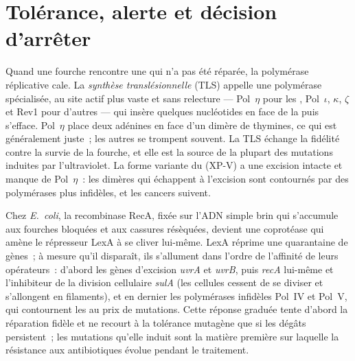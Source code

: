 \section{Tolérance, alerte et décision d'arrêter}

\begin{definition}\label{def:b3:dna-repair:tls}
Quand une fourche rencontre une  qui n'a pas été réparée, la
polymérase réplicative cale. La \emph{synthèse translésionnelle} (TLS)
appelle une polymérase spécialisée, au site actif plus vaste et sans
relecture --- Pol~$\eta$ pour les , Pol~$\iota$,
$\kappa$, $\zeta$ et Rev1 pour d'autres  --- qui insère quelques
nucléotides en face de la  puis s'efface. Pol~$\eta$ place deux
adénines en face d'un dimère de thymines, ce qui est généralement
juste~; les autres se trompent souvent. La TLS échange la fidélité
contre la survie de la fourche, et elle est la source de la plupart des
mutations induites par l'ultraviolet. La forme variante du  (XP-V) a une excision intacte et manque de Pol~$\eta$~: les
dimères qui échappent à l'excision sont contournés par des polymérases
plus infidèles, et les cancers suivent.
\end{definition}

\begin{proposition}\label{prop:b3:dna-repair:sos}
Chez \emph{E.~coli}, la recombinase RecA, fixée sur l'ADN simple brin
qui s'accumule aux fourches bloquées et aux cassures résèquées, devient
une coprotéase qui amène le répresseur LexA à se cliver lui-même. LexA
réprime une quarantaine de gènes~; à mesure qu'il disparaît, ils
s'allument dans l'ordre de l'affinité de leurs opérateurs~: d'abord les
gènes d'excision \emph{uvrA} et \emph{uvrB}, puis \emph{recA} lui-même
et l'inhibiteur de la division cellulaire \emph{sulA} (les cellules
cessent de se diviser et s'allongent en filaments), et en dernier les
polymérases infidèles Pol~IV et Pol~V, qui contournent les  au
prix de mutations. Cette réponse graduée tente d'abord la réparation
fidèle et ne recourt à la tolérance mutagène que si les dégâts
persistent~; les mutations qu'elle induit sont la matière première sur
laquelle la résistance aux antibiotiques évolue pendant le traitement.
\end{proposition}

